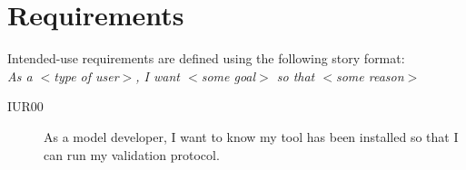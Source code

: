 \newpage
\section{Requirements}
Intended-use requirements are defined using the following story format: \\
\hspace*{1.5cm}\emph{As a $<$type of user$>$, I want $<$some goal$>$ so that $<$some reason$>$}

\begin{description}

\item[IUR00] \quad
As a model developer, I want to know my tool has been installed so that I can
run my validation protocol.

\end{description}

